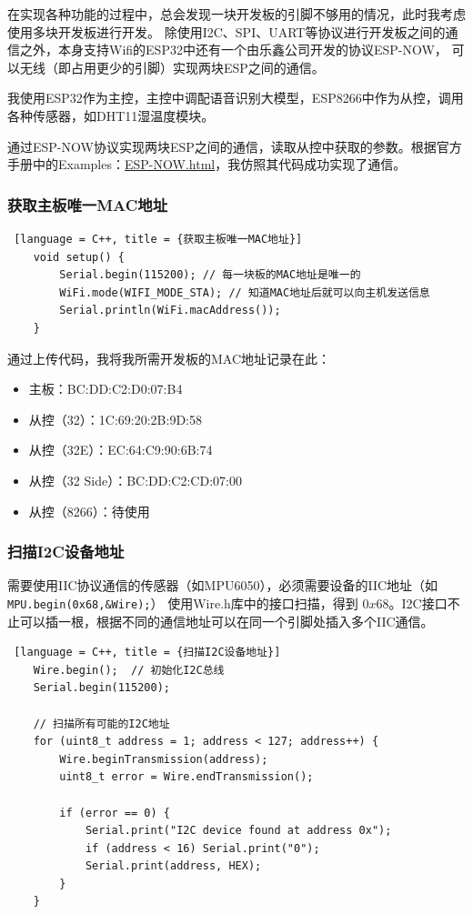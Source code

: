 在实现各种功能的过程中，总会发现一块开发板的引脚不够用的情况，此时我考虑使用多块开发板进行开发。
除使用I2C、SPI、UART等协议进行开发板之间的通信之外，本身支持Wifi的ESP32中还有一个由乐鑫公司开发的协议ESP-NOW，
可以无线（即占用更少的引脚）实现两块ESP之间的通信。

我使用ESP32作为主控，主控中调配语音识别大模型，ESP8266中作为从控，调用各种传感器，如DHT11湿温度模块。

通过ESP-NOW协议实现两块ESP之间的通信，读取从控中获取的参数。根据官方手册中的Examples：\href{https://docs.espressif.com/projects/arduino-esp32/en/latest/api/espnow.html?highlight=esp\%20now}{\underline{ESP-NOW.html}}，我仿照其代码成功实现了通信。

\subsubsection{获取主板唯一MAC地址}

\begin{lstlisting} [language = C++, title = {获取主板唯一MAC地址}]
    void setup() {
        Serial.begin(115200); // 每一块板的MAC地址是唯一的
        WiFi.mode(WIFI_MODE_STA); // 知道MAC地址后就可以向主机发送信息
        Serial.println(WiFi.macAddress());
    }
\end{lstlisting}

通过上传代码，我将我所需开发板的MAC地址记录在此：

\begin{itemize}
    \item 主板：BC:DD:C2:D0:07:B4
    \item 从控（32）：1C:69:20:2B:9D:58
    \item 从控（32E）：EC:64:C9:90:6B:74
    \item 从控（32 Side）：BC:DD:C2:CD:07:00
    \item 从控（8266）：待使用
\end{itemize}

\subsubsection{扫描I2C设备地址}

需要使用IIC协议通信的传感器（如MPU6050），必须需要设备的IIC地址（如\texttt{MPU.begin(0x68,\&Wire);}）
使用Wire.h库中的接口扫描，得到 $0x68$。I2C接口不止可以插一根，根据不同的通信地址可以在同一个引脚处插入多个IIC通信。

\begin{lstlisting} [language = C++, title = {扫描I2C设备地址}]
    Wire.begin();  // 初始化I2C总线
    Serial.begin(115200);

    // 扫描所有可能的I2C地址
    for (uint8_t address = 1; address < 127; address++) {
        Wire.beginTransmission(address);
        uint8_t error = Wire.endTransmission();

        if (error == 0) {
            Serial.print("I2C device found at address 0x");
            if (address < 16) Serial.print("0");
            Serial.print(address, HEX);
        }
    }
\end{lstlisting}

